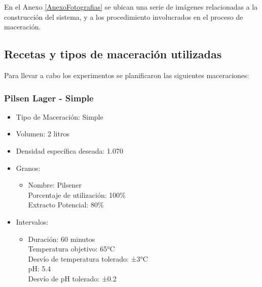         En el Anexo \ref{AnexoFotografias} se ubican una serie de imágenes relacionadas a la construcción del sistema, y a los procedimiento involucrados en el proceso de maceración.
    \subsection{Recetas y tipos de maceración utilizadas}
        \par Para llevar a cabo los experimentos se planificaron las siguientes maceraciones:
            \subsubsection{Pilsen Lager - Simple} 
                \begin{itemize}
                    \item Tipo de Maceración: Simple
                    \item Volumen: 2 litros
                    \item Densidad específica deseada: 1.070
                    \item Granos:
                        \begin{itemize}
                            \item Nombre: Pilsener \\
                                Porcentaje de utilización: 100\% \\
                                Extracto Potencial: 80\%
                        \end{itemize}
                    \item Intervalos:
                        \begin{itemize}
                            \item Duración: 60 minutos \\
                             Temperatura objetivo: 65°C \\
                             Desvío de temperatura tolerado: ±3°C \\
                             pH: 5.4 \\
                             Desvío de pH tolerado: ±0.2 \\
                        \end{itemize}
                \end{itemize}
                
